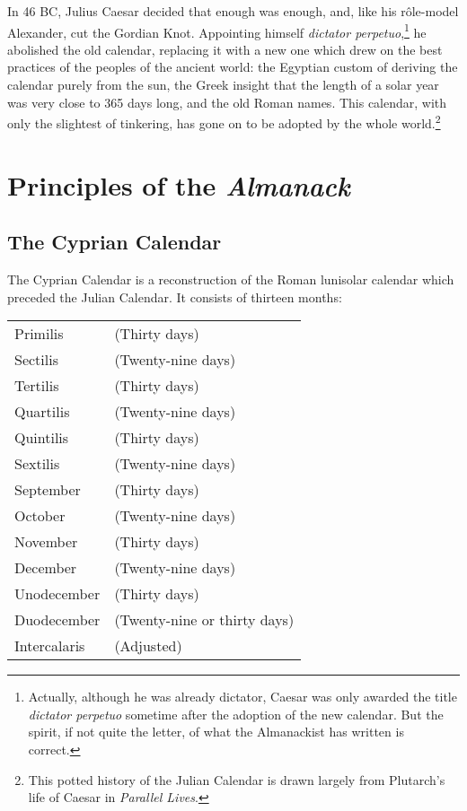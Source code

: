 \documentclass[0main.tex]{subfiles}
\begin{document}
In 46 BC, Julius Caesar decided that enough was enough, and, like his r\^ole-model Alexander, cut the Gordian Knot. Appointing himself \emph{dictator perpetuo},\footnote{Actually, although he was already dictator, Caesar was only awarded the title \emph{dictator perpetuo} sometime after the adoption of the new calendar. But the spirit, if not quite the letter, of what the Almanackist has written is correct.} he abolished the old calendar, replacing it with a new one which drew on the best practices of the peoples of the ancient world: the Egyptian custom of deriving the calendar purely from the sun, the Greek insight that the length of a solar year was very close to 365 days long, and the old Roman names. This calendar, with only the slightest of tinkering, has gone on to be adopted by the whole world.\footnote{This potted history of the Julian Calendar is drawn largely from Plutarch's life of Caesar in \emph{Parallel Lives}.}

\chapter*{Principles of the \emph{Almanack}}
\renewcommand*{\theHsection}{ch3.\the\value{section}}
\setcounter{section}{0}

\section{The Cyprian Calendar}

The Cyprian Calendar is a reconstruction of the Roman lunisolar calendar which preceded the Julian Calendar. It consists of thirteen months:

\begin{table}[h]
\begin{tabular}{l l}
Primilis & (Thirty days)\\
Sectilis & (Twenty-nine days)\\
Tertilis & (Thirty days)\\
Quartilis & (Twenty-nine days)\\
Quintilis & (Thirty days)\\
Sextilis & (Twenty-nine days)\\
September & (Thirty days)\\
October & (Twenty-nine days)\\
November & (Thirty days)\\
December & (Twenty-nine days)\\
Unodecember & (Thirty days)\\
Duodecember & (Twenty-nine or thirty days)\\
Intercalaris & (Adjusted)
\end{tabular}
\end{table}
\end{document}
